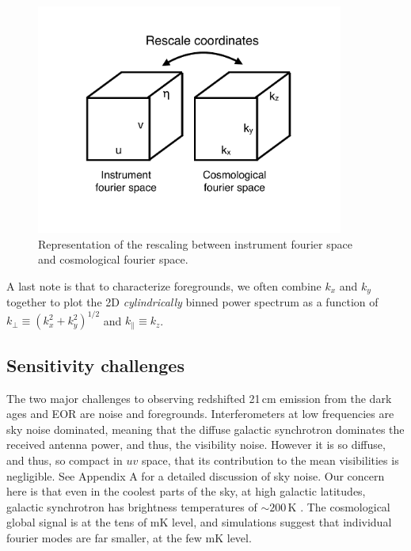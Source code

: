{\begin{figure}[h]
    \centering
    \includegraphics[width=0.9\textwidth]{chap0_intro/ifo_space_cosmo.pdf}
    \caption{Representation of the rescaling between instrument fourier space and cosmological fourier space.}
    \label{fig:ifospacecosmo}
\end{figure}

A last note is that to characterize foregrounds, we often combine $k_x$ and $k_y$ together to plot the 2D \textit{cylindrically} binned power spectrum as a function of $k_\perp\equiv(k_x^2+k_y^2)^{1/2}$ and $k_\parallel\equiv k_z$.




\subsection{Sensitivity challenges}
\label{sec:sensitivity}

The two major challenges to observing redshifted 21\,cm emission from the dark ages and EOR are noise and foregrounds. Interferometers at low frequencies are sky noise dominated, meaning that the diffuse galactic synchrotron dominates the received antenna power, and thus, the visibility noise. However it is so diffuse, and thus, so compact in $uv$ space, that its contribution to the mean visibilities is negligible. See Appendix A for a detailed discussion of sky noise. Our concern here is that even in the coolest parts of the sky, at high galactic latitudes, galactic synchrotron has brightness temperatures of $\sim200$\,K \citep{Tsysmemo}. The cosmological global signal is at the tens of mK level, and simulations suggest that individual fourier modes are far smaller, at the few mK level. 

}

